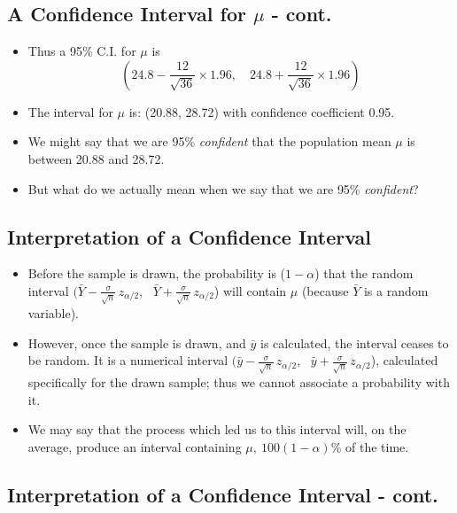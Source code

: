 \documentclass[
  letterpaper,
  DIV=11,
  numbers=noendperiod]{scrartcl}
\begin{document}
\subsection{\texorpdfstring{A Confidence Interval for \(\mu\) -
cont.}{A Confidence Interval for \textbackslash mu - cont.}}\label{a-confidence-interval-for-mu---cont.-3}

\begin{itemize}
\item
  Thus a 95\% C.I. for \(\mu\) is
  \[\left( 24.8 - \frac{12}{\sqrt{36}} \times 1.96, \quad
           24.8 + \frac{12}{\sqrt{36}} \times  1.96 \right)\]
\item
  The interval for \(\mu\) is: (20.88, 28.72) with confidence
  coefficient 0.95.
\item
  We might say that we are {95\% \emph{confident}} that the population
  mean \(\mu\) is between 20.88 and 28.72.
\item
  But what do we actually mean when we say that we are {95\%
  \emph{confident}}?
\end{itemize}

\subsection{Interpretation of a Confidence
Interval}\label{interpretation-of-a-confidence-interval}

\begin{itemize}
\item
  Before the sample is drawn, the probability is (\(1-\alpha\)) that the
  {random interval}
  \((\bar{Y} - \frac{\sigma}{\sqrt{n}} \, z_{\alpha/2}\),
  ~\(\bar{Y} + \frac{\sigma}{\sqrt{n}} \, z_{\alpha/2}\)) will contain
  \(\mu\) (because \(\bar{Y}\) is a random variable).
\item
  However, once the sample is drawn, and \(\bar{y}\) is calculated, the
  interval ceases to be random. It is a numerical interval
  \((\bar{y} - \frac{\sigma}{\sqrt{n}} \, z_{\alpha/2}\),
  ~\(\bar{y} + \frac{\sigma}{\sqrt{n}} \, z_{\alpha/2}\)), calculated
  specifically for the drawn sample; thus we cannot associate a
  {probability} with it.
\item
  We may say that the process which led us to this interval will, on the
  average, produce an interval containing \(\mu,\  100 (1-\alpha)\)\% of
  the time.
\end{itemize}

\subsection{Interpretation of a Confidence Interval -
cont.}\label{interpretation-of-a-confidence-interval---cont.}
\end{document}
